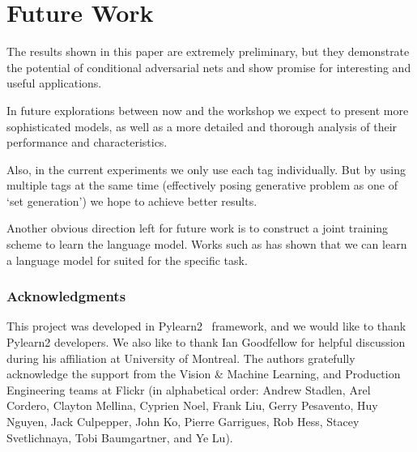 \documentclass{article} %
\begin{document}
\section{Future Work}
The results shown in this paper are extremely preliminary, but they demonstrate the potential of
conditional adversarial nets and show promise for interesting and useful applications.

In future explorations between now and the workshop we expect to present more sophisticated models,
as well as a more detailed and thorough analysis of their performance and characteristics.


Also, in the current experiments we only use each tag individually.
But by using multiple tags at the same time (effectively posing generative problem as one of `set generation')
we hope to achieve better results.

Another obvious direction left for future work is to construct a joint training scheme to learn the language model. Works such as
\cite{kiros2013multimodal} has shown that we can learn a language model for suited for the specific task.


\subsubsection*{Acknowledgments}
This project was developed in
Pylearn2~\citep{goodfellow2013pylearn2} framework, and we would like to thank Pylearn2 developers. 
We also like to thank Ian Goodfellow for helpful discussion during his affiliation at University of Montreal.
The authors gratefully acknowledge the support from the Vision \& Machine Learning, and Production
Engineering teams at Flickr (in alphabetical order: Andrew Stadlen, Arel Cordero, Clayton Mellina,
Cyprien Noel, Frank Liu, Gerry Pesavento, Huy Nguyen, Jack Culpepper, John Ko, Pierre Garrigues,
Rob Hess, Stacey Svetlichnaya, Tobi Baumgartner, and Ye Lu).


\small{

}
\end{document}
